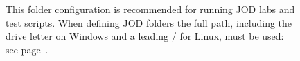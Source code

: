 
\begin{figure}[htbp]
  \centering
  \hfill
\caption[JOD Folders]{This folder configuration is recommended for running JOD labs and test scripts. When defining JOD folders the full path, including the drive letter on Windows and a
leading / for Linux, must be used: see page~\pageref{lst:foldercfg}.} 
  \label{eps:jodfolders}
\end{figure}
